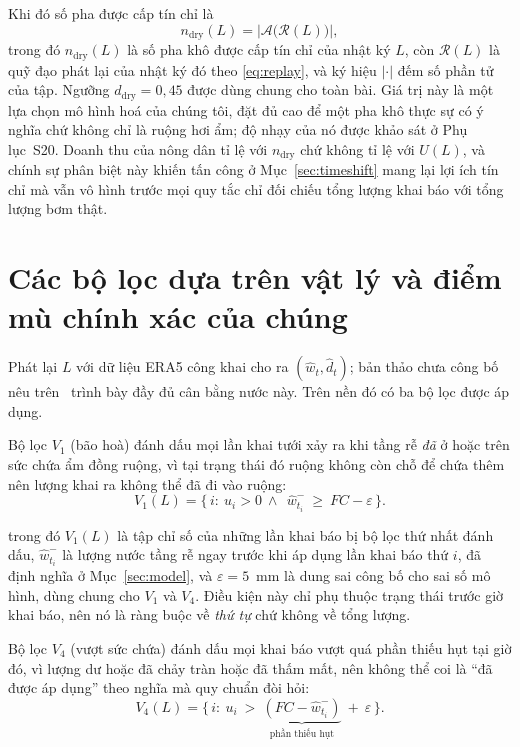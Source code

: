 Khi đó số pha được cấp tín chỉ là
\begin{equation}
n_{\mathrm{dry}}(L)=\bigl|\mathcal{A}\bigl(\mathcal{R}(L)\bigr)\bigr|,
\label{eq:ndry}
\end{equation}
trong đó $n_{\mathrm{dry}}(L)$ là số pha khô được cấp tín chỉ của nhật ký $L$, còn
$\mathcal{R}(L)$ là quỹ đạo phát lại của nhật ký đó theo \eqref{eq:replay}, và ký
hiệu $|\cdot|$ đếm số phần tử của tập. Ngưỡng $d_{\mathrm{dry}}=0{,}45$ được dùng
chung cho toàn bài. Giá trị này là một lựa chọn mô hình hoá của chúng tôi, đặt đủ cao để một pha khô thực sự có ý nghĩa
chứ không chỉ là ruộng hơi ẩm; độ nhạy của nó được khảo sát ở Phụ lục~S20.
Doanh thu của nông dân tỉ lệ với $n_{\mathrm{dry}}$ chứ không tỉ lệ với $U(L)$,
và chính sự phân biệt này khiến tấn công ở Mục~\ref{sec:timeshift} mang lại lợi
ích tín chỉ mà vẫn vô hình trước mọi quy tắc chỉ đối chiếu tổng lượng khai báo
với tổng lượng bơm thật.

\section{Các bộ lọc dựa trên vật lý và điểm mù chính xác của chúng}
\label{sec:filters}

Phát lại $L$ với dữ liệu ERA5 công khai cho ra $(\hat w_t,\hat d_t)$; bản thảo chưa công bố nêu trên~\cite{twingate2026} trình bày đầy đủ cân bằng nước này. Trên nền đó có
ba bộ lọc được áp dụng.

Bộ lọc \emph{$V_1$} (bão hoà) đánh dấu mọi lần khai tưới xảy ra khi tầng rễ
\emph{đã} ở hoặc trên sức chứa ẩm đồng ruộng, vì tại trạng thái đó ruộng không
còn chỗ để chứa thêm nên lượng khai ra không thể đã đi vào ruộng:
\begin{equation}
V_1(L)=\{\,i:\ u_i>0\ \wedge\ \ \hat w_{t_i}^{-}\ \ge\ FC-\varepsilon\,\}.
\label{eq:v1}
\end{equation}

trong đó $V_1(L)$ là tập chỉ số của những lần khai báo bị bộ lọc thứ nhất đánh dấu,
$\hat w_{t_i}^{-}$ là lượng nước tầng rễ ngay trước khi áp dụng lần khai báo
thứ $i$, đã định nghĩa ở Mục~\ref{sec:model}, và $\varepsilon=5$~mm là dung sai
công bố cho sai số mô hình, dùng chung cho $V_1$ và $V_4$. Điều kiện này chỉ phụ
thuộc trạng thái trước giờ khai báo, nên nó là ràng buộc về \emph{thứ tự} chứ không
về tổng lượng.

Bộ lọc \emph{$V_4$} (vượt sức chứa) đánh dấu mọi khai báo vượt quá phần thiếu hụt
tại giờ đó, vì lượng dư hoặc đã chảy tràn hoặc đã thấm mất, nên không thể coi là
``đã được áp dụng'' theo nghĩa mà quy chuẩn đòi hỏi:
\begin{equation}
V_4(L)=\{\,i:\ u_i\ >\ \underbrace{(FC-\hat w_{t_i}^{-})}_{\text{phần thiếu hụt}}
\ +\ \varepsilon\,\}.
\label{eq:v4}
\end{equation}

